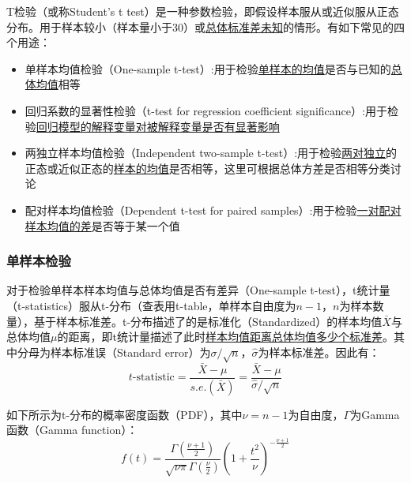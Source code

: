 \documentclass[11pt]{article}
\begin{document}
T检验（或称Student's t test）是一种参数检验，即假设样本服从或近似服从正态分布。用于样本较小（样本量小于30）或\uline{总体标准差未知}的情形。有如下常见的四个用途：
\begin{itemize}
    \item 单样本均值检验（One-sample t-test）:用于检验\uline{单样本的均值}是否与已知的\uline{总体均值}相等
    \item 回归系数的显著性检验（t-test for regression coefficient significance）:用于检验\uline{回归模型的解释变量对被解释变量是否有显著影响}
    \item 两独立样本均值检验（Independent two-sample t-test）:用于检验\uline{两对独立}的正态或近似正态的\uline{样本的均值}是否相等，这里可根据总体方差是否相等分类讨论
    \item 配对样本均值检验（Dependent t-test for paired samples）:用于检验\uline{一对配对样本均值的差}是否等于某一个值
\end{itemize}

\subsubsection{单样本检验}

对于检验单样本样本均值与总体均值是否有差异（One-sample t-test），t统计量（t-statistics）服从t-分布（查表用t-table，单样本自由度为$n-1$，$n$为样本数量），基于样本标准差。t-分布描述了的是标准化（Standardized）的样本均值$\bar{X}$与总体均值$\mu$的距离，即t统计量描述了此时\uline{样本均值距离总体均值多少个标准差}。其中分母为样本标准误（Standard error）为$\sigma/\sqrt{n}$，$\hat{\sigma}$为样本标准差。因此有：
\begin{equation*}
    t\text{-statistic} = \frac{\bar{X}-\mu}{s.e.(\bar{X})} = \frac{\bar{X}-\mu}{\hat{\sigma}/\sqrt{n}}
\end{equation*}

如下所示为t-分布的概率密度函数（PDF），其中$\nu=n-1$为自由度，$\Gamma$为Gamma函数（Gamma function）：
\begin{equation*}
    f(t) = \frac{\Gamma\left( \frac{\nu+1}{2} \right)}{\sqrt{\nu\pi} \Gamma\left( \frac{\nu}{2} \right)} \left( 1+\frac{t^2}{\nu} \right)^{-\frac{\nu+1}{2}}
\end{equation*}
\end{document}
